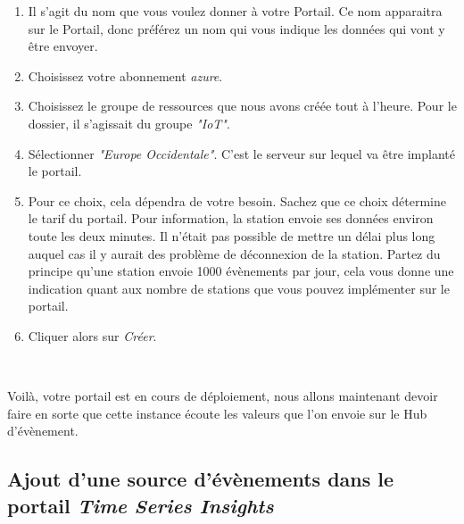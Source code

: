 \begin{enumerate}
\begin{enumerate}
	\item Il s'agit du nom que vous voulez donner à votre Portail. Ce nom apparaitra sur le Portail, donc préférez un nom qui vous indique les données qui vont y être envoyer.
	
	\item Choisissez votre abonnement \textit{azure}.
	
	\item Choisissez le groupe de ressources que nous avons créée tout à l'heure. Pour le dossier, il s'agissait du groupe \textit{"IoT"}.
	\item Sélectionner \textit{"Europe Occidentale"}. C'est le serveur sur lequel va être implanté le portail.
	
	\item Pour ce choix, cela dépendra de votre besoin. Sachez que ce choix détermine le tarif du portail. Pour information, la station envoie ses données environ toute les deux minutes. Il n'était pas possible de mettre un délai plus long auquel cas il y aurait des problème de déconnexion de la station. Partez du principe qu'une station envoie 1000 évènements par jour, cela vous donne une indication quant aux nombre de stations que vous pouvez implémenter sur le portail.
	\item Cliquer alors sur \textit{Créer}.
	
\end{enumerate} \\
\end{enumerate}

Voilà, votre portail est en cours de déploiement, nous allons maintenant devoir faire en sorte que cette instance écoute les valeurs que l'on envoie sur le Hub d'évènement.

\subsection{Ajout d'une source d'évènements dans le portail \textit{Time Series Insights}}








	
	




